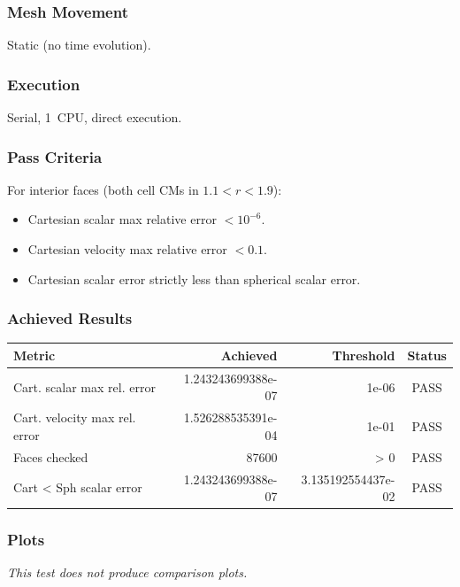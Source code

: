 \documentclass[11pt,a4paper]{article}
\begin{document}
\subsubsection*{Mesh Movement}
Static (no time evolution).

\subsubsection*{Execution}
Serial, 1~CPU, direct execution.

\subsubsection*{Pass Criteria}
For interior faces (both cell CMs in $1.1 < r < 1.9$):
\begin{itemize}
  \item Cartesian scalar max relative error $< 10^{-6}$.
  \item Cartesian velocity max relative error $< 0.1$.
  \item Cartesian scalar error strictly less than spherical scalar error.
\end{itemize}

\subsubsection*{Achieved Results}
\begin{table}[htbp]
\centering
\begin{tabular}{l r r c}
\toprule
\textbf{Metric} & \textbf{Achieved} & \textbf{Threshold} & \textbf{Status} \\
\midrule
Cart. scalar max rel. error & 1.243243699388e-07 & 1e-06 & {\color{green!60!black}PASS} \\
Cart. velocity max rel. error & 1.526288535391e-04 & 1e-01 & {\color{green!60!black}PASS} \\
Faces checked & 87600 & > 0 & {\color{green!60!black}PASS} \\
Cart < Sph scalar error & 1.243243699388e-07 & 3.135192554437e-02 & {\color{green!60!black}PASS} \\
\bottomrule
\end{tabular}
\end{table}

\subsubsection*{Plots}
\textit{This test does not produce comparison plots.}
\end{document}
